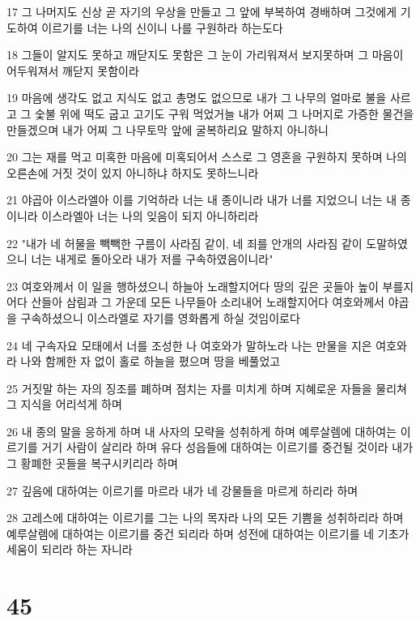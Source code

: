 \par 17 그 나머지도 신상 곧 자기의 우상을 만들고 그 앞에 부복하여 경배하며 그것에게 기도하여 이르기를 너는 나의 신이니 나를 구원하라 하는도다
\par 18 그들이 알지도 못하고 깨닫지도 못함은 그 눈이 가리워져서 보지못하며 그 마음이 어두워져서 깨닫지 못함이라
\par 19 마음에 생각도 없고 지식도 없고 총명도 없으므로 내가 그 나무의 얼마로 불을 사르고 그 숯불 위에 떡도 굽고 고기도 구워 먹었거늘 내가 어찌 그 나머지로 가증한 물건을 만들겠으며 내가 어찌 그 나무토막 앞에 굴복하리요 말하지 아니하니
\par 20 그는 재를 먹고 미혹한 마음에 미혹되어서 스스로 그 영혼을 구원하지 못하며 나의 오른손에 거짓 것이 있지 아니하냐 하지도 못하느니라
\par 21 야곱아 이스라엘아 이를 기억하라 너는 내 종이니라 내가 너를 지었으니 너는 내 종이니라 이스라엘아 너는 나의 잊음이 되지 아니하리라
\par 22 "내가 네 허물을 빽빽한 구름이 사라짐 같이, 네 죄를 안개의 사라짐 같이 도말하였으니 너는 내게로 돌아오라 내가 저를 구속하였음이니라"
\par 23 여호와께서 이 일을 행하셨으니 하늘아 노래할지어다 땅의 깊은 곳들아 높이 부를지어다 산들아 삼림과 그 가운데 모든 나무들아 소리내어 노래할지어다 여호와께서 야곱을 구속하셨으니 이스라엘로 자기를 영화롭게 하실 것임이로다
\par 24 네 구속자요 모태에서 너를 조성한 나 여호와가 말하노라 나는 만물을 지은 여호와라 나와 함께한 자 없이 홀로 하늘을 폈으며 땅을 베풀었고
\par 25 거짓말 하는 자의 징조를 폐하며 점치는 자를 미치게 하며 지혜로운 자들을 물리쳐 그 지식을 어리석게 하며
\par 26 내 종의 말을 응하게 하며 내 사자의 모략을 성취하게 하며 예루살렘에 대하여는 이르기를 거기 사람이 살리라 하며 유다 성읍들에 대하여는 이르기를 중건될 것이라 내가 그 황폐한 곳들을 복구시키리라 하며
\par 27 깊음에 대하여는 이르기를 마르라 내가 네 강물들을 마르게 하리라 하며
\par 28 고레스에 대하여는 이르기를 그는 나의 목자라 나의 모든 기쁨을 성취하리라 하며 예루살렘에 대하여는 이르기를 중건 되리라 하며 성전에 대하여는 이르기를 네 기초가 세움이 되리라 하는 자니라

\chapter{45}

